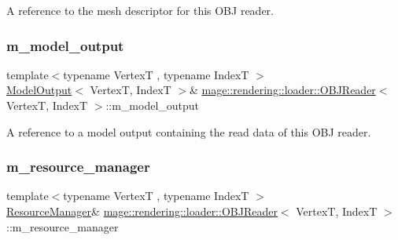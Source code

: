 A reference to the mesh descriptor for this O\+BJ reader. \mbox{\label{classmage_1_1rendering_1_1loader_1_1_o_b_j_reader_a645fca7c3f7f9860cb879f4088c4f8fc}} 
\subsubsection{\texorpdfstring{m\+\_\+model\+\_\+output}{m\_model\_output}}
{\footnotesize\ttfamily template$<$typename VertexT , typename IndexT $>$ \\
\mbox{\hyperlink{structmage_1_1rendering_1_1_model_output}{Model\+Output}}$<$ VertexT, IndexT $>$\& \mbox{\hyperlink{classmage_1_1rendering_1_1loader_1_1_o_b_j_reader}{mage\+::rendering\+::loader\+::\+O\+B\+J\+Reader}}$<$ VertexT, IndexT $>$\+::m\+\_\+model\+\_\+output\hspace{0.3cm}{\ttfamily [private]}}

A reference to a model output containing the read data of this O\+BJ reader. \mbox{\label{classmage_1_1rendering_1_1loader_1_1_o_b_j_reader_ae6208964e05f3e93eb9939942fe3b55c}} 
\subsubsection{\texorpdfstring{m\+\_\+resource\+\_\+manager}{m\_resource\_manager}}
{\footnotesize\ttfamily template$<$typename VertexT , typename IndexT $>$ \\
\mbox{\hyperlink{classmage_1_1rendering_1_1_resource_manager}{Resource\+Manager}}\& \mbox{\hyperlink{classmage_1_1rendering_1_1loader_1_1_o_b_j_reader}{mage\+::rendering\+::loader\+::\+O\+B\+J\+Reader}}$<$ VertexT, IndexT $>$\+::m\+\_\+resource\+\_\+manager\hspace{0.3cm}{\ttfamily [private]}}

